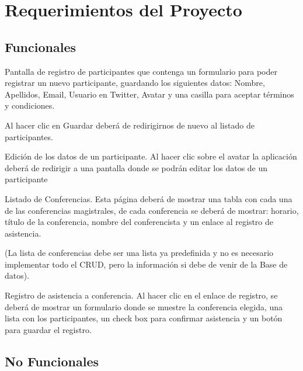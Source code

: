 \chapter{Requerimientos del Proyecto}

\setcounter{cRequerimientos}{0}
\newcommand{\IncReq}{\addtocounter{cRequerimientos}{1}}


\section{Funcionales}
\begin{list}{RF\_\IncReq\thecRequerimientos}{}
	\item Pantalla de registro de participantes que contenga un formulario para poder registrar un nuevo participante, guardando los siguientes datos: Nombre, Apellidos, Email, Usuario en Twitter, Avatar y una casilla para aceptar términos y condiciones.
	
	Al hacer clic en Guardar deberá de redirigirnos de nuevo al listado de participantes.
	
	\item Edición  de los datos de un participante.  Al hacer clic sobre el avatar la aplicación deberá de redirigir 
	a una pantalla donde se podrán editar los datos de un participante
	
	\item Listado de Conferencias. Esta página deberá de mostrar una tabla con cada una de las conferencias magistrales, de cada conferencia se deberá de mostrar: horario, título de la conferencia, nombre del conferencista y un enlace al registro de asistencia.
	
	(La lista de conferencias debe ser una lista ya predefinida y no es necesario implementar todo el CRUD, pero la información si debe de venir de la Base de datos).
	
	\item Registro de asistencia a conferencia. Al hacer clic en el enlace de registro, se deberá de mostrar un formulario donde se muestre la conferencia elegida, una lista con los participantes, un check box para confirmar asistencia y un botón para guardar el registro.
	
	
\end{list}

\section{No Funcionales}

